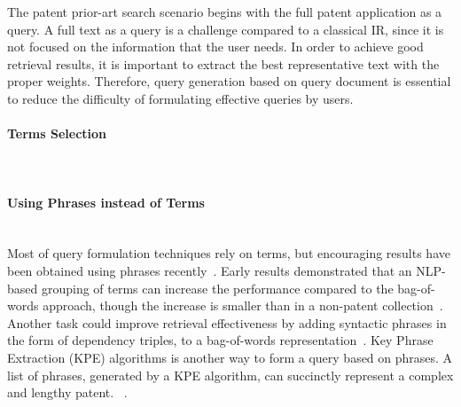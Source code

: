 The patent prior-art search scenario begins with the full patent application as a query. A full text as a query is a challenge compared to a classical IR, since it is not focused on the information that the user needs. In order to achieve good retrieval results, it is important to extract the best representative text with the proper weights. Therefore, query generation based on query document is essential to reduce the difficulty of formulating effective queries by users. 
\paragraph{Terms Selection}
\ \\


\paragraph{Using Phrases instead of Terms}
\ \\
Most of query formulation techniques rely on terms, but encouraging results have been obtained using phrases recently~\citep{becks2010phrases}. Early results demonstrated that an NLP-based grouping of terms can increase the performance compared to the bag-of-words approach, though the increase is smaller than in a non-patent collection~\citep{osborn1997evaluating}. Another task could improve retrieval effectiveness by adding syntactic phrases in the form of dependency triples, to a bag-of-words representation~\citep{d2011combining}. Key Phrase Extraction (KPE) algorithms is another way to form a query based on phrases. A list of phrases, generated by a KPE algorithm, can succinctly represent a complex and lengthy patent. ~\citep{verma2011applying}.

